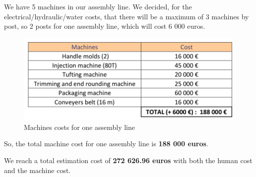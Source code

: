 We have 5 machines in our assembly line. We decided, for the electrical/hydraulic/water costs, that there will be a maximum of 3 machines by post, so 2 posts for one assembly line, which will cost 6 000 euros.

\begin{figure}[h]

	\centering
	\includegraphics[scale=0.6]{Img/machineCost.png}
	\caption{Machines costs for one assembly line}

\end{figure}

So, the total machine cost for one assembly line is \textbf{188 000 euros}.

We reach a total estimation cost of \textbf{272 626.96 euros} with both the human cost and the machine cost.
